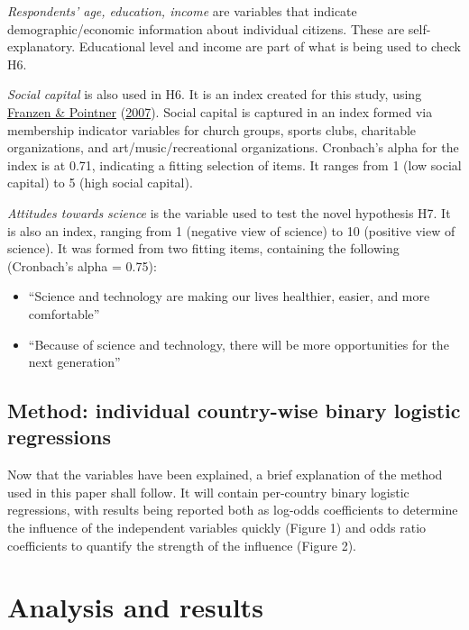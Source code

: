 \documentclass[
  12pt,
  english,
]{article}
\providecommand{\tightlist}{%
  \setlength{\itemsep}{0pt}\setlength{\parskip}{0pt}}
\begin{document}
\emph{Respondents' age, education, income} are variables that indicate
demographic/economic information about individual citizens. These are
self-explanatory. Educational level and income are part of what is being
used to check H6.

\emph{Social capital} is also used in H6. It is an index created for
this study, using
\protect\hyperlink{ref-franzen2007sozialkapital}{Franzen \& Pointner}
(\protect\hyperlink{ref-franzen2007sozialkapital}{2007}). Social capital
is captured in an index formed via membership indicator variables for
church groups, sports clubs, charitable organizations, and
art/music/recreational organizations. Cronbach's alpha for the index is
at 0.71, indicating a fitting selection of items. It ranges from 1 (low
social capital) to 5 (high social capital).

\emph{Attitudes towards science} is the variable used to test the novel
hypothesis H7. It is also an index, ranging from 1 (negative view of
science) to 10 (positive view of science). It was formed from two
fitting items, containing the following (Cronbach's alpha = 0.75):

\begin{itemize}
\tightlist
\item
  ``Science and technology are making our lives healthier, easier, and
  more comfortable''
\item
  ``Because of science and technology, there will be more opportunities
  for the next generation''
\end{itemize}

\hypertarget{method-individual-country-wise-binary-logistic-regressions}{%
\subsection{Method: individual country-wise binary logistic
regressions}\label{method-individual-country-wise-binary-logistic-regressions}}

Now that the variables have been explained, a brief explanation of the
method used in this paper shall follow. It will contain per-country
binary logistic regressions, with results being reported both as
log-odds coefficients to determine the influence of the independent
variables quickly (Figure 1) and odds ratio coefficients to quantify the
strength of the influence (Figure 2).

\hypertarget{analysis-and-results}{%
\section{Analysis and results}\label{analysis-and-results}}
\end{document}
